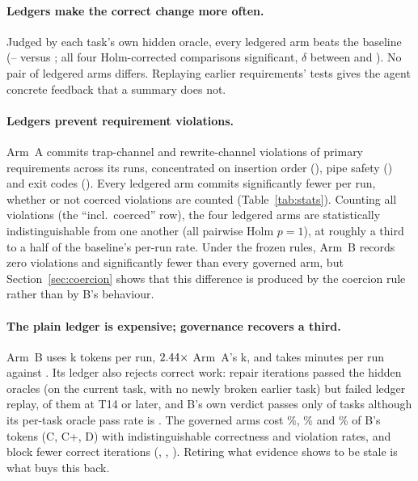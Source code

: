 \documentclass[11pt]{article}
\begin{document}
\paragraph{Ledgers make the correct change more often.} Judged by each task's
own hidden oracle, every ledgered arm beats the baseline (\NMOnePassD--\NMOnePassC{}
versus \NMOnePassA; all four Holm-corrected comparisons significant, $\delta$
between \NStMOnePassDvsADelta{} and \NStMOnePassCvsADelta). No pair of ledgered
arms differs. Replaying earlier requirements' tests gives the agent concrete
feedback that a summary does not.

\paragraph{Ledgers prevent requirement violations.} Arm~A commits \NTrapA{}
trap-channel and \NRewriteA{} rewrite-channel violations of primary
requirements across its \NSeedsPerArm{} runs, concentrated on insertion order
(\NHOneRTwoOrderA), pipe safety (\NHOneROneTwoPipesafetyA) and exit codes
(\NHOneROneOneExitcodesA). Every ledgered arm commits significantly fewer per
run, whether or not coerced violations are counted (Table~\ref{tab:stats}).
Counting all violations (the ``incl.\ coerced'' row), the four ledgered arms
are statistically indistinguishable from one another (all pairwise Holm
$p=1$), at roughly a third to a half of the baseline's per-run rate. Under the
frozen rules, Arm~B records zero violations and significantly fewer than every
governed arm, but Section~\ref{sec:coercion} shows that this difference is
produced by the coercion rule rather than by B's behaviour.

\paragraph{The plain ledger is expensive; governance recovers a third.} Arm~B
uses \NKtokB{}k tokens per run, $2.44\times$ Arm~A's \NKtokA{}k, and
takes \NWallMinB{} minutes per run against \NWallMinA. Its ledger also rejects
correct work: \NMFourLocalB{} repair iterations passed the hidden oracles (on
the current task, with no newly broken earlier task) but failed ledger replay,
\NMFourLocalBFromTFourteen{} of them at T14 or later, and B's own verdict
passes only \NVerdictPassB{} of tasks although its per-task oracle pass rate is
\NMOnePassB. The governed arms cost \NTokPctOfBC\%, \NTokPctOfBCplus\% and
\NTokPctOfBD\% of B's tokens (C, C+, D) with indistinguishable correctness and
violation rates, and block fewer correct iterations (\NMFourLocalC,
\NMFourLocalCplus, \NMFourLocalD). Retiring what evidence shows to be stale is
what buys this back.
\end{document}
